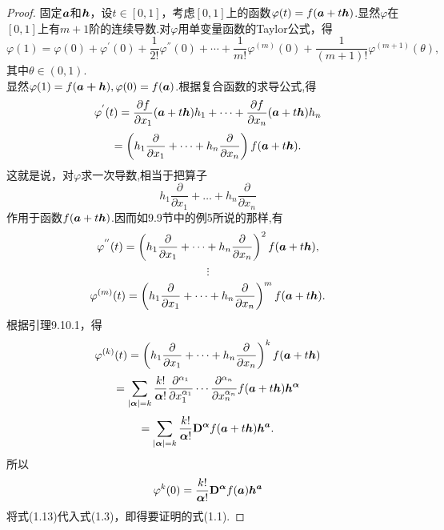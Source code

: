 \documentclass[lang=cn,11pt,normal]{elegantbook}
\begin{document}
	\begin{proof}
		固定$\boldsymbol{a}$和$\boldsymbol{h}$，设$t\in[0,1]$，考虑$[0,1]$上的函数$\varphi(t)=f(\boldsymbol{a}+t\boldsymbol{h})$.显然$\varphi$在$[0,1]$上有$m+1$阶的连续导数.对$\varphi$用单变量函数的Taylor公式，得
		\begin{equation}
		\varphi(1)=\varphi (0)+\varphi^{'}(0)+\frac{1}{2!}\varphi^{''}(0)+\cdots+\frac{1}{m!}\varphi^{(m)}(0)+\frac{1}{(m+1)!}\varphi^{(m+1)}(\theta),
		\end{equation}
		其中$\theta \in (0,1).$\\
		显然$\varphi(1)=f(\boldsymbol{a+h}),\varphi(0)=f(\boldsymbol{a})$.根据复合函数的求导公式,得\\
		\begin{equation}
		\varphi^{'}(t)=\frac{\partial f}{\partial x_1}(\boldsymbol{a}+t\boldsymbol{h})h_1+\dots+\frac{\partial f}{\partial x_n}(\boldsymbol{a}+t\boldsymbol{h})h_n
		\end{equation}
		\begin{equation}
		=\left(h_1\frac{\partial}{\partial x_1}+\dots+h_n\frac{\partial}{\partial x_n}\right)f(\boldsymbol{a}+t\boldsymbol{h}).
		\end{equation}
		这就是说，对$\varphi$求一次导数,相当于把算子
		\begin{equation}
		h_1\frac{\partial}{\partial x_1}+\dots+h_n\frac{\partial}{\partial x_n}
		\end{equation}
		作用于函数$f(\boldsymbol{a}+t\boldsymbol{h})$.因而如9.9节中的例5所说的那样,有
		\begin{equation}
		\varphi^{''}(t)=\left(h_1\frac{\partial}{\partial x_1}+\dots+h_n\frac{\partial}{\partial x_n}\right)^2f(\boldsymbol{a}+t\boldsymbol{h}),
		\end{equation}
		\begin{equation}
		\vdots
		\end{equation}
		\begin{equation}
		\varphi^{(m)}(t)=\left(h_1\frac{\partial}{\partial x_1}+\dots+h_n\frac{\partial}{\partial x_n}\right)^{m}f(\boldsymbol{a}+t\boldsymbol{h}).
		\end{equation}
		根据引理9.10.1，得
		\begin{equation}
		\varphi^{(k)}(t)=\left(h_1\frac{\partial}{\partial x_1}+\dots+h_n\frac{\partial}{\partial x_n}\right)^{k}f(\boldsymbol{a}+t\boldsymbol{h})
		\end{equation}
		\begin{equation}
		=\sum_{|\boldsymbol{\alpha}|=k}\frac{k!}{\boldsymbol{\alpha}!}\frac{\partial^{\alpha_1}}{\partial x^{\alpha_1}_1}\cdots\frac{\partial^{\alpha_n}}{\partial x^{\alpha_n}_n}f(\boldsymbol{a}+t\boldsymbol{h})\boldsymbol{h^{\alpha}}
		\end{equation}
		\begin{equation}
		=\sum_{|\boldsymbol{\alpha}|=k}\frac{k!}{\boldsymbol{\alpha}!}\mathbf{D}^{\boldsymbol{\alpha}}f(\boldsymbol{a}+t\boldsymbol{h})\boldsymbol{h^a}.
		\end{equation}
		所以\\
		\begin{equation}
		\varphi^{k}(0)=\frac{k!}{\boldsymbol{\alpha}!}\mathbf{D}^{\boldsymbol{\alpha}}f(\boldsymbol{a})\boldsymbol{h^a}
		\end{equation}
		将式(1.13)代入式(1.3)，即得要证明的式(1.1).
	\end{proof}
\end{document}
